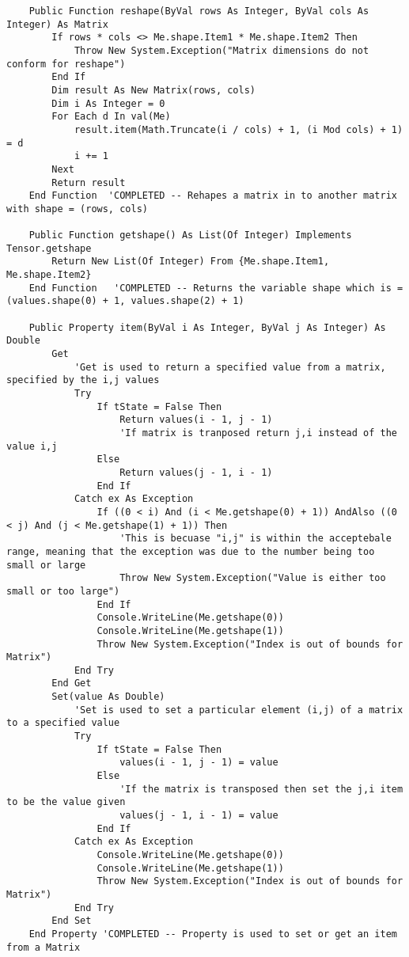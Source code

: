 \begin{verbatim}
    Public Function reshape(ByVal rows As Integer, ByVal cols As Integer) As Matrix
        If rows * cols <> Me.shape.Item1 * Me.shape.Item2 Then
            Throw New System.Exception("Matrix dimensions do not conform for reshape")
        End If
        Dim result As New Matrix(rows, cols)
        Dim i As Integer = 0
        For Each d In val(Me)
            result.item(Math.Truncate(i / cols) + 1, (i Mod cols) + 1) = d
            i += 1
        Next
        Return result
    End Function  'COMPLETED -- Rehapes a matrix in to another matrix with shape = (rows, cols)

    Public Function getshape() As List(Of Integer) Implements Tensor.getshape
        Return New List(Of Integer) From {Me.shape.Item1, Me.shape.Item2}
    End Function   'COMPLETED -- Returns the variable shape which is = (values.shape(0) + 1, values.shape(2) + 1)

    Public Property item(ByVal i As Integer, ByVal j As Integer) As Double
        Get
            'Get is used to return a specified value from a matrix, specified by the i,j values
            Try
                If tState = False Then
                    Return values(i - 1, j - 1)
                    'If matrix is tranposed return j,i instead of the value i,j
                Else
                    Return values(j - 1, i - 1)
                End If
            Catch ex As Exception
                If ((0 < i) And (i < Me.getshape(0) + 1)) AndAlso ((0 < j) And (j < Me.getshape(1) + 1)) Then
                    'This is becuase "i,j" is within the acceptebale range, meaning that the exception was due to the number being too small or large 
                    Throw New System.Exception("Value is either too small or too large")
                End If
                Console.WriteLine(Me.getshape(0))
                Console.WriteLine(Me.getshape(1))
                Throw New System.Exception("Index is out of bounds for Matrix")
            End Try
        End Get
        Set(value As Double)
            'Set is used to set a particular element (i,j) of a matrix to a specified value
            Try
                If tState = False Then
                    values(i - 1, j - 1) = value
                Else
                    'If the matrix is transposed then set the j,i item to be the value given
                    values(j - 1, i - 1) = value
                End If
            Catch ex As Exception
                Console.WriteLine(Me.getshape(0))
                Console.WriteLine(Me.getshape(1))
                Throw New System.Exception("Index is out of bounds for Matrix")
            End Try
        End Set
    End Property 'COMPLETED -- Property is used to set or get an item from a Matrix


\end{verbatim}
